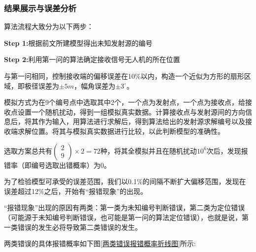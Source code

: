 \documentclass{ctexart}
\begin{document}
\subsubsection{结果展示与误差分析}

算法流程大致分为以下两步：

\textbf{Step 1:}根据前文所建模型得出未知发射源的编号

\textbf{Step 2:}利用第一问的算法确定接收信号无人机的所在位置

与第一问相同，控制接收端的偏移误差在10\%以内，构造一个近似为方形的扇形区域，即极径误差为$\pm 5m $，幅角误差为$\pm 3^{\circ}$。

模拟方式为在9个编号点中选取其中2个，一个点为发射点，一个点为接收点，给接收点设置一个随机扰动，得到一组模拟真实数据。计算接收点与发射源间的方向信息后，将其作为输入，用算法进行求解后，得到算法给出的发射源求解编号以及接收端求解位置。将其与模拟真实数据进行比较，以此判断模型的准确性。

选取方案总共有$\begin{pmatrix} 2 \\ 9 \end{pmatrix}\times 2=72$种，将其全模拟并且在随机扰动$10^6$次后，发现报错率（即编号选取出错概率）为0。

为了检验模型可承受的误差范围，我们以0.1\%的间隔不断扩大偏移范围，发现在误差超过12\%之后，开始有“报错现象”的出现。

“报错现象”出现的原因有两类：第一类为未知编号判断错误，第二类为定位错误（可能源于未知编号判断错误，也可能是第一问的算法定位错误），也就是说，第一类错误的发生必将导致第二类错误的发生。

两类错误的具体报错概率如下图\ref{两类错误报错概率折线图}所示:
\end{document}
